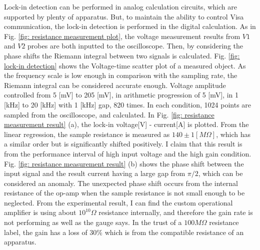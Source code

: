 \documentclass{article}
\begin{document}
Lock-in detection can be performed in analog calculation circuits, which are supported by plenty of apparatus.
But, to maintain the ability to control Visa communication, the lock-in detection is performed in the digital calculation.
As in Fig. \ref{fig: resistance measurement plot}, the voltage measurement results from $V1$ and $V2$ probes are both inputted to the oscilloscope.
Then, by considering the phase shifts the Riemann integral between two signals is calculated.
Fig. \ref{fig: lock-in detection} shows the Voltage-time scatter plot of a measured object.
As the frequency scale is low enough in comparison with the sampling rate, the Riemann integral can be considered accurate enough.
Voltage amplitude controlled from 5 [mV] to 205 [mV], in arithmetic progression of 5 [mV], in 1 [kHz] to 20 [kHz] with 1 [kHz] gap, 820 times.
In each condition, 1024 points are sampled from the oscilloscope, and calculated.
In Fig. \ref{fig: resistance measurement result} (a), the lock-in voltage[V] - current[A] is plotted.
From the linear regression, the sample resistance is measured as $140\pm 1 [M \Omega]$, which has a similar order but is significantly shifted positively.
I claim that this result is from the performance interval of high input voltage and the high gain condition.
Fig. \ref{fig: resistance measurement result} (b) shows the phase shift between the input signal and the result current having a large gap from $\pi/2$, which can be considered an anomaly.
The unexpected phase shift occurs from the internal resistance of the op-amp when the sample resistance is not small enough to be neglected.
From the experimental result, I can find the custom operational amplifier is using about $10^10 \Omega$ resistance internally, and therefore the gain rate is not performing as well as the gauge says.
In the trust of a $100M \Omega$ resistance label, the gain has a loss of $30\%$ which is from the compatible resistance of an apparatus.
\end{document}
